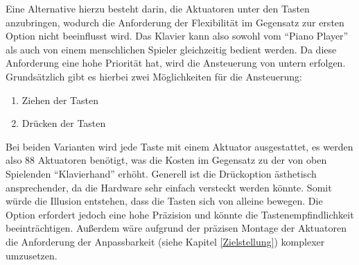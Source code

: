 Eine Alternative hierzu besteht darin, die Aktuatoren unter den Tasten anzubringen, wodurch die Anforderung der Flexibilität
im Gegensatz zur ersten Option nicht beeinflusst wird.\newline
Das Klavier kann also sowohl vom \enquote{Piano Player} als auch von einem menschlichen Spieler gleichzeitig bedient werden.
Da diese Anforderung eine hohe Priorität hat, wird die Ansteuerung von untern erfolgen. \newline
Grundsätzlich gibt es hierbei zwei Möglichkeiten für die Ansteuerung:
\begin{enumerate}
	\item Ziehen der Tasten
	\item Drücken der Tasten
\end{enumerate}
Bei beiden Varianten wird jede Taste mit einem Aktuator
ausgestattet, es werden also 88 Aktuatoren benötigt, was die Kosten %
im Gegensatz zu der von oben Spielenden \enquote{Klavierhand}
erhöht.
Generell ist die Drückoption ästhetisch ansprechender, da die Hardware sehr einfach versteckt werden könnte.
Somit würde die Illusion entstehen, dass die Tasten sich von alleine bewegen. Die Option erfordert jedoch eine hohe Präzision und könnte die
Tastenempfindlichkeit beeinträchtigen. Außerdem wäre aufgrund der präzisen Montage der Aktuatoren die Anforderung
der Anpassbarkeit (siehe Kapitel \ref{Zielstellung}) komplexer umzusetzen.


